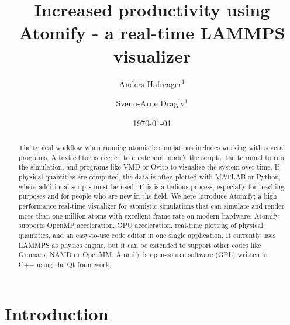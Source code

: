 \documentclass[aps,pre,twocolumn,letterpaper,floatfix,nofootinbib]{revtex4}
\begin{document}
\title{Increased productivity using Atomify - a real-time LAMMPS visualizer}
\author{Anders Hafreager$^1$}
\author{Svenn-Arne Dragly$^{1}$} 
\date{\today} 


\begin{abstract}
%
The typical workflow when running atomistic simulations includes working with several programs.
A text editor is needed to create and modify the scripts, the terminal to run the simulation, and programs like VMD or Ovito to visualize the system over time.
If physical quantities are computed, the data is often plotted with MATLAB or Python, where additional scripts must be used.
This is a tedious process, especially for teaching purposes and for people who are new in the field.
We here introduce Atomify; a high performance real-time visualizer for atomistic simulations that can simulate and render more than one million atoms with excellent frame rate on modern hardware.
Atomify supports OpenMP acceleration, GPU acceleration, real-time plotting of physical quantities, and an easy-to-use code editor in one single application.
It currently uses LAMMPS as physics engine, but it can be extended to support other codes like Gromacs, NAMD or OpenMM.
Atomify is open-source software (GPL) written in C++ using the Qt framework.
%
\end{abstract} 
 
\maketitle

\section{Introduction}
\end{document}
